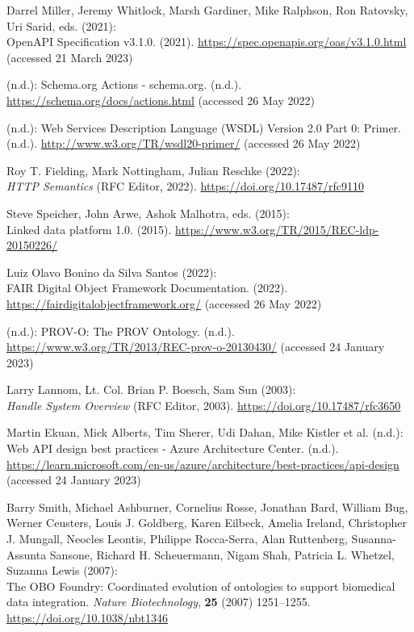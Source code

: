 \begin{thebibliography}{9}
Darrel Miller, Jeremy Whitlock, Marsh Gardiner, Mike Ralphson, Ron
Ratovsky, Uri Sarid, eds. (2021): \\
{OpenAPI Specification} v3.1.0.
(2021). \url{https://spec.openapis.org/oas/v3.1.0.html} (accessed 21
March 2023)

(n.d.): Schema.org {Actions} - schema.org. (n.d.).
\url{https://schema.org/docs/actions.html} (accessed 26 May 2022)

(n.d.): Web {Services Description Language} ({WSDL}) {Version} 2.0
{Part} 0: {Primer}. (n.d.). \url{http://www.w3.org/TR/wsdl20-primer/}
(accessed 26 May 2022)

Roy T. Fielding, Mark Nottingham, Julian Reschke (2022): \\
\emph{{HTTP
Semantics}} ({RFC Editor}, 2022).
\url{https://doi.org/10.17487/rfc9110}

Steve Speicher, John Arwe, Ashok Malhotra, eds. (2015): \\
Linked data
platform 1.0. (2015). \url{https://www.w3.org/TR/2015/REC-ldp-20150226/}

Luiz Olavo Bonino da Silva Santos (2022): \\
{FAIR Digital Object Framework
Documentation}. (2022). \url{https://fairdigitalobjectframework.org/}
(accessed 26 May 2022)

(n.d.): {PROV-O}: {The PROV Ontology}. (n.d.).
\url{https://www.w3.org/TR/2013/REC-prov-o-20130430/} (accessed 24
January 2023)

Larry Lannom, Lt. Col. Brian P. Boesch, Sam Sun (2003): \\
\emph{Handle
{System Overview}} ({RFC Editor}, 2003).
\url{https://doi.org/10.17487/rfc3650}

Martin Ekuan, Mick Alberts, Tim Sherer, Udi Dahan, Mike Kistler et
al. (n.d.): Web {API} design best practices - {Azure Architecture
Center}. (n.d.).
\url{https://learn.microsoft.com/en-us/azure/architecture/best-practices/api-design}
(accessed 24 January 2023)

Barry Smith, Michael Ashburner, Cornelius Rosse, Jonathan Bard, William
Bug, Werner Ceusters, Louis J. Goldberg, Karen Eilbeck, Amelia Ireland,
Christopher J. Mungall, Neocles Leontis, Philippe Rocca-Serra, Alan
Ruttenberg, Susanna-Assunta Sansone, Richard H. Scheuermann, Nigam Shah,
Patricia L. Whetzel, Suzanna Lewis (2007): \\
The {OBO Foundry}:
Coordinated evolution of ontologies to support biomedical data
integration. \emph{Nature Biotechnology}, \textbf{25} (2007) 1251--1255.
\url{https://doi.org/10.1038/nbt1346}


\end{thebibliography}
